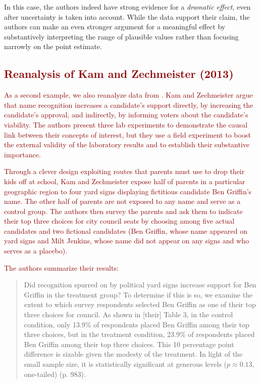 \documentclass[12pt]{article}
\newcommand{\kelly}[1]{\textcolor{darkred}{#1}}
\begin{document}
In this case, the authors indeed have strong evidence for a \emph{dramatic effect}, even after uncertainty is taken into account. While the data support their claim, the authors can make an even stronger argument for a meaningful effect by substantively interpreting the range of plausible values rather than focusing narrowly on the point estimate. 

\kelly{\section*{Reanalysis of Kam and Zechmeister (2013)}}

\kelly{As a second example, we also reanalyze data from \cite{KamZechmeister2013}. Kam and Zechmeister argue that name recognition increases a candidate's support directly, by increasing the candidate's approval, and indirectly, by informing voters about the candidate's viability. The authors present three lab experiments to demonstrate the causal link between their concepts of interest, but they use a field experiment to boost the external validity of the laboratory results and to establish their substantive importance.}

\kelly{Through a clever design exploiting routes that parents must use to drop their kids off at school, Kam and Zechmeister expose half of parents in a particular geographic region to four yard signs displaying fictitious candidate Ben Griffin's name. The other half of parents are not exposed to any name and serve as a control group. The authors then survey the parents and ask them to indicate their top three choices for city council seats by choosing among five actual candidates and two fictional candidates (Ben Griffin, whose name appeared on yard signs and Milt Jenkins, whose name did not appear on any signs and who serves as a placebo).}

\kelly{The authors summarize their results:}

\kelly{\begin{quote}
Did recognition spurred on by political yard signs increase support for Ben Griffin in the treatment group? To determine if this is so, we examine the extent to which survey respondents selected Ben Griffin as one of their top three choices for council. As shown in [their] Table 3, in the control condition, only 13.9\% of respondents placed Ben Griffin among their top three choices, but in the treatment condition, 23.9\% of respondents placed Ben Griffin among their top three choices. This 10 percentage point difference is sizable given the modesty of the treatment. In light of the small sample size, it is statistically significant at generous levels ($p \approx 0.13$, one-tailed) (p. 983).
\end{quote}}
\end{document}

